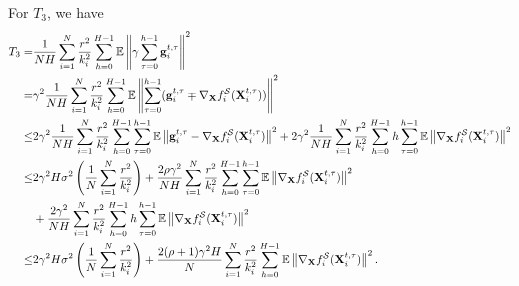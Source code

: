 \documentclass{article} %
\theoremstyle{plain}
\theoremstyle{definition}
\begin{document}
For $T_3$, we have
\begin{align}
    T_3 =& \frac{1}{NH} \sum_{i=1}^{N} \frac{r^2}{k_i^2} \sum_{h=0}^{H-1} \mathbb{E} \left \| \gamma \sum_{\tau=0}^{h-1} {\bf g}^{t,\tau}_i
    \right \|^2 \nonumber\\
    =& \gamma^2 \frac{1}{NH} \sum_{i=1}^{N} \frac{r^2}{k_i^2} \sum_{h=0}^{H-1} \mathbb{E} \left \| \sum_{\tau=0}^{h-1} ( {\bf g}^{t,\tau}_i \mp  \nabla_{\bf X} f_i^{\mathcal{S}} ({\bf X}_i^{t,\tau}) )
    \right \|^2 \nonumber\\
    \leq & 2 \gamma^2 \frac{1}{NH} \sum_{i=1}^{N} \frac{r^2}{k_i^2} \sum_{h=0}^{H-1}  \sum_{\tau=0}^{h-1} \mathbb{E} \left \| {\bf g}^{t,\tau}_i - \nabla_{\bf X} f_i^{\mathcal{S}} ({\bf X}_i^{t,\tau})
    \right \|^2 +  2\gamma^2 \frac{1}{NH} \sum_{i=1}^{N} \frac{r^2}{k_i^2} \sum_{h=0}^{H-1} h \sum_{\tau=0}^{h-1} \mathbb{E} \left \|\nabla_{\bf X} f_i^{\mathcal{S}} ({\bf X}_i^{t,\tau})
    \right \|^2 \nonumber\\
    \leq & 2\gamma^2 H \sigma^2 \left( \frac{1}{N} \sum_{i=1}^{N} \frac{r^2}{k_i^2} \right) 
    +  \frac{2 \rho \gamma^2}{NH} \sum_{i=1}^{N} \frac{r^2}{k_i^2} \sum_{h=0}^{H-1}  \sum_{\tau=0}^{h-1} \mathbb{E} \left \|\nabla_{\bf X} f_i^{\mathcal{S}} ({\bf X}_i^{t,\tau})
    \right \|^2 \nonumber \\
    &+ \frac{2\gamma^2}{NH} \sum_{i=1}^{N} \frac{r^2}{k_i^2} \sum_{h=0}^{H-1} h \sum_{\tau=0}^{h-1} \mathbb{E} \left \| \nabla_{\bf X} f_i^{\mathcal{S}} ({\bf X}_i^{t,\tau})
    \right \|^2 \nonumber\\
    \leq & 2\gamma^2 H \sigma^2 \left( \frac{1}{N} \sum_{i=1}^{N} \frac{r^2}{k_i^2} \right) 
    + \frac{2 (\rho+1) \gamma^2 H}{N} \sum_{i=1}^{N} \frac{r^2}{k_i^2} \sum_{h=0}^{H-1} \mathbb{E} \left \| \nabla_{\bf X} f_i^{\mathcal{S}} ({\bf X}_i^{t,\tau})
    \right \|^2. \label{T_3_intermiate_1}
\end{align}
\end{document}
